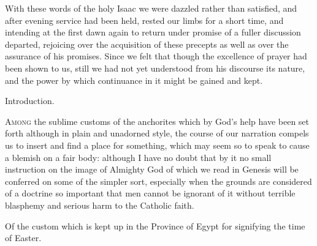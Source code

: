 With these words of the holy Isaac we were dazzled rather than satisfied, and after evening service had been held, rested our limbs for a short time, and intending at the first dawn again to return under promise of a fuller discussion departed, rejoicing over the acquisition of these precepts as well as over the assurance of his promises. Since we felt that though the excellence of prayer had been shown to us, still we had not yet understood from his discourse its nature, and the power by which continuance in it might be gained and kept.



Introduction.

\textsc{Among} the sublime customs of the anchorites which by God’s help have been set forth although in plain and unadorned style, the course of our narration compels us to insert and find a place for something, which may seem so to speak to cause a blemish on a fair body: although I have no doubt that by it no small instruction on the image of Almighty God of which we read in Genesis will be conferred on some of the simpler sort, especially when the grounds are considered of a doctrine so important that men cannot be ignorant of it without terrible blasphemy and serious harm to the Catholic faith.


Of the custom which is kept up in the Province of Egypt for signifying the time of Easter.

